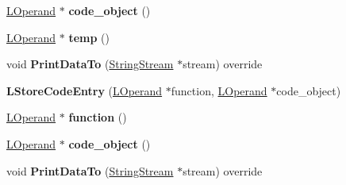 \begin{DoxyCompactItemize}
\item 
\hyperlink{classv8_1_1internal_1_1_l_operand}{L\+Operand} $\ast$ {\bfseries code\+\_\+object} ()\hypertarget{classv8_1_1internal_1_1_l_store_code_entry_a59ea37ff8315982d7ff3a2b177c70e07}{}\label{classv8_1_1internal_1_1_l_store_code_entry_a59ea37ff8315982d7ff3a2b177c70e07}

\item 
\hyperlink{classv8_1_1internal_1_1_l_operand}{L\+Operand} $\ast$ {\bfseries temp} ()\hypertarget{classv8_1_1internal_1_1_l_store_code_entry_a1ec180089a957e480115a96347403a10}{}\label{classv8_1_1internal_1_1_l_store_code_entry_a1ec180089a957e480115a96347403a10}

\item 
void {\bfseries Print\+Data\+To} (\hyperlink{classv8_1_1internal_1_1_string_stream}{String\+Stream} $\ast$stream) override\hypertarget{classv8_1_1internal_1_1_l_store_code_entry_a8fad8edaa1b22ad4a43d20eb1c01ec87}{}\label{classv8_1_1internal_1_1_l_store_code_entry_a8fad8edaa1b22ad4a43d20eb1c01ec87}

\item 
{\bfseries L\+Store\+Code\+Entry} (\hyperlink{classv8_1_1internal_1_1_l_operand}{L\+Operand} $\ast$function, \hyperlink{classv8_1_1internal_1_1_l_operand}{L\+Operand} $\ast$code\+\_\+object)\hypertarget{classv8_1_1internal_1_1_l_store_code_entry_aaf96cdc9f56546a0e460ccfc7b95e1f1}{}\label{classv8_1_1internal_1_1_l_store_code_entry_aaf96cdc9f56546a0e460ccfc7b95e1f1}

\item 
\hyperlink{classv8_1_1internal_1_1_l_operand}{L\+Operand} $\ast$ {\bfseries function} ()\hypertarget{classv8_1_1internal_1_1_l_store_code_entry_a864f2ea5e3b25989bb3366d09c523843}{}\label{classv8_1_1internal_1_1_l_store_code_entry_a864f2ea5e3b25989bb3366d09c523843}

\item 
\hyperlink{classv8_1_1internal_1_1_l_operand}{L\+Operand} $\ast$ {\bfseries code\+\_\+object} ()\hypertarget{classv8_1_1internal_1_1_l_store_code_entry_a59ea37ff8315982d7ff3a2b177c70e07}{}\label{classv8_1_1internal_1_1_l_store_code_entry_a59ea37ff8315982d7ff3a2b177c70e07}

\item 
void {\bfseries Print\+Data\+To} (\hyperlink{classv8_1_1internal_1_1_string_stream}{String\+Stream} $\ast$stream) override\hypertarget{classv8_1_1internal_1_1_l_store_code_entry_a8fad8edaa1b22ad4a43d20eb1c01ec87}{}\label{classv8_1_1internal_1_1_l_store_code_entry_a8fad8edaa1b22ad4a43d20eb1c01ec87}


\end{DoxyCompactItemize}
